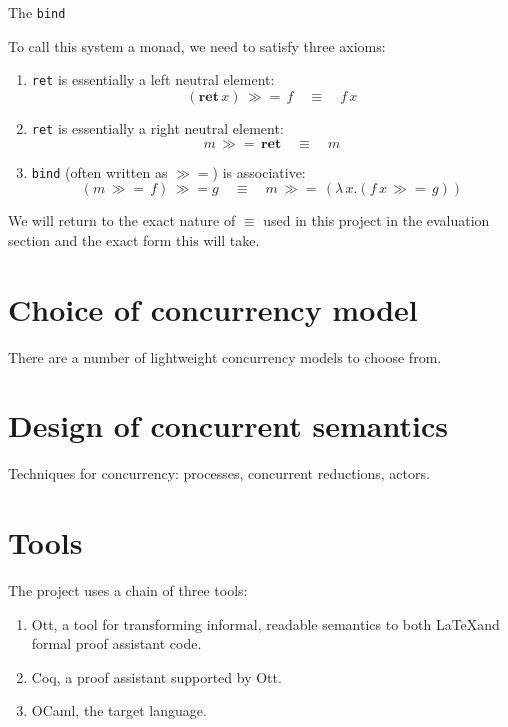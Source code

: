\documentclass[12pt,twoside,notitlepage]{report}
\begin{document}
The \lstinline|bind|   

To call this system a monad, we need to satisfy three axioms:

\begin{enumerate}
\item{\lstinline|ret| is essentially a left neutral element:
\[ (\textbf{ret} \, x) \, \gg=\, f \quad \equiv \quad f \, x \]}
\item{\lstinline|ret| is essentially a right neutral element:
\[ m \, \gg=\, \textbf{ret} \quad \equiv \quad m \]}
\item{\lstinline|bind| (often written as $ \gg= $) is associative:
\[ (m \, \gg= \, f) \, \gg= g \quad \equiv \quad m\, \gg= \, (\lambda\, x. (f\, x \, \gg= \, g) ) \]}
\end{enumerate}

We will return to the exact nature of $ \equiv $ used in this project in the evaluation section and the exact form this will take.



\section{Choice of concurrency model}
There are a number of lightweight concurrency models to choose from. 




\section{Design of concurrent semantics}
Techniques for concurrency: processes, concurrent reductions, actors.




\section{Tools}
The project uses a chain of three tools: \begin{enumerate}
\item{
Ott, a tool for transforming informal, readable semantics to both \LaTeX and formal proof assistant code.}
\item{Coq, a proof assistant supported by Ott. }
\item{OCaml, the target language. }
\end{enumerate}
\end{document}
